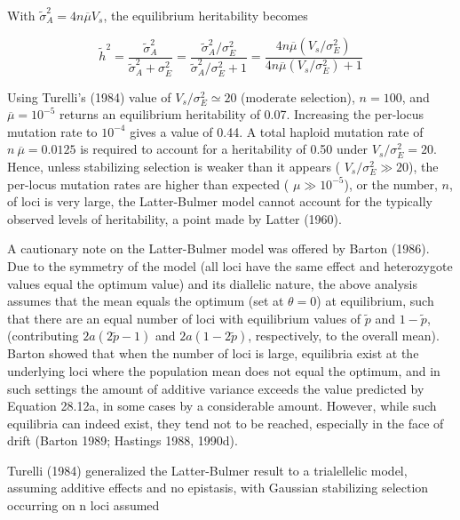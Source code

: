 \documentclass{article}
\begin{document}
With  $ \widetilde{\sigma}_{A}^{2}=4n\overline{\mu}V_{s} $, the equilibrium heritability becomes

\begin{equation}
\widetilde{h}^{2}=\frac{\widetilde{\sigma}_{A}^{2}}{\widetilde{\sigma}_{A}^{2}+\sigma_{E}^{2}}=\frac{\widetilde{\sigma}_{A}^{2}/\sigma_{E}^{2}}{\widetilde{\sigma}_{A}^{2}/\sigma_{E}^{2}+1}=\frac{4n\overline{\mu}\left(V_{s}/\sigma_{E}^{2}\right)}{4n\overline{\mu}\left(V_{s}/\sigma_{E}^{2}\right)+1}
\tag{28.12e}
\label{eq:28_12e}
\end{equation}

Using Turelli's (1984) value of  $ V_s/\sigma_E^2 \simeq 20 $ (moderate selection),  $ n = 100 $, and  $ \overline{\mu} = 10^{-5} $ returns an equilibrium heritability of 0.07. Increasing the per-locus mutation rate to  $ 10^{-4} $ gives a value of 0.44. A total haploid mutation rate of  $ n\ \overline{\mu} = 0.0125 $ is required to account for a heritability of 0.50 under  $ V_s/\sigma_E^2 = 20 $. Hence, unless stabilizing selection is weaker than it appears ( $ V_s/\sigma_E^2 \gg 20 $), the per-locus mutation rates are higher than expected ( $ \mu \gg 10^{-5} $), or the number,  $ n $, of loci is very large, the Latter-Bulmer model cannot account for the typically observed levels of heritability, a point made by Latter (1960).

A cautionary note on the Latter-Bulmer model was offered by Barton (1986). Due to the symmetry of the model (all loci have the same effect and heterozygote values equal the optimum value) and its diallelic nature, the above analysis assumes that the mean equals the optimum (set at  $ \theta = 0 $) at equilibrium, such that there are an equal number of loci with equilibrium values of  $ \widetilde{p} $ and  $ 1 - \widetilde{p} $, (contributing  $ 2a(2\widetilde{p} - 1) $ and  $ 2a(1 - 2\widetilde{p}) $, respectively, to the overall mean). Barton showed that when the number of loci is large, equilibria exist at the underlying loci where the population mean does not equal the optimum, and in such settings the amount of additive variance exceeds the value predicted by Equation 28.12a, in some cases by a considerable amount. However, while such equilibria can indeed exist, they tend not to be reached, especially in the face of drift (Barton 1989; Hastings 1988, 1990d).

Turelli (1984) generalized the Latter-Bulmer result to a trialellelic model, assuming additive effects and no epistasis, with Gaussian stabilizing selection occurring on n loci assumed
\end{document}
